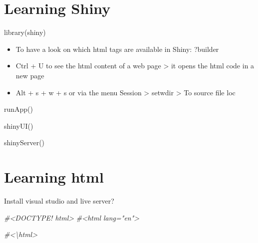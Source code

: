 \documentclass[
]{book}
\newenvironment{Shaded}{\begin{snugshade}}{\end{snugshade}}
\newcommand{\CommentTok}[1]{\textcolor[rgb]{0.56,0.35,0.01}{\textit{#1}}}
\begin{document}
\hypertarget{learning-shiny}{%
\chapter{Learning Shiny}\label{learning-shiny}}

library(shiny)

\begin{itemize}
\item
  To have a look on which html tags are available in Shiny:
  ?builder
\item
  Ctrl + U to see the html content of a web page \textgreater{} it opens the html code in a new page
\item
  Alt + s + w + s
  or via the menu Session \textgreater{} setwdir \textgreater{} To source file loc
\end{itemize}

runApp()

shinyUI()

shinyServer()

\hypertarget{learning-html}{%
\chapter{Learning html}\label{learning-html}}

Install visual studio and live server?

\begin{Shaded}
\begin{Highlighting}[]
\CommentTok{\#\textless{}DOCTYPE! html\textgreater{}}
\CommentTok{\#\textless{}html lang="en"\textgreater{}}


\CommentTok{\#\textless{}\textbackslash{}html\textgreater{}}
\end{Highlighting}
\end{Shaded}


  
\end{document}

